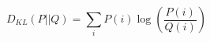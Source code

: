 \begin{equation}
    D_{KL}(P || Q) = \sum_{i} P(i) \log \left( \frac{P(i)}{Q(i)} \right)
    \label{eq:kld}
\end{equation}